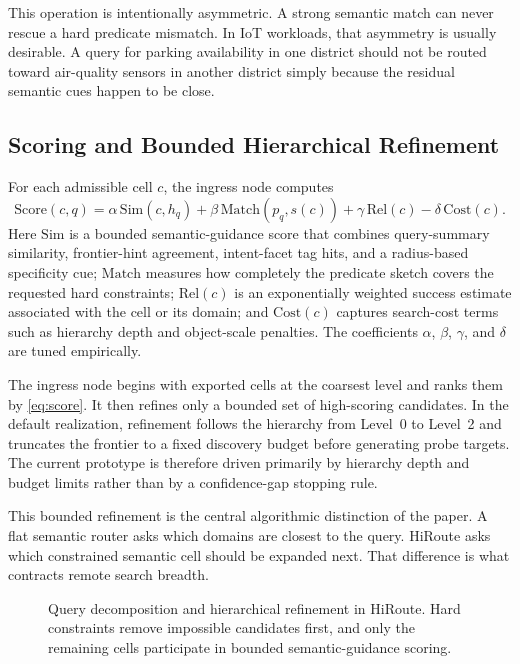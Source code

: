 \documentclass[journal]{IEEEtran}
\newcommand{\sysname}{HiRoute}
\newcommand{\score}{\mathrm{Score}}
\newcommand{\simf}{\mathrm{Sim}}
\newcommand{\matchf}{\mathrm{Match}}
\newcommand{\relf}{\mathrm{Rel}}
\newcommand{\costf}{\mathrm{Cost}}
\newcommand{\placeholderbox}[2]{%
  \begin{center}
  \fbox{\parbox[c][#1][c]{0.93\linewidth}{\centering #2}}
  \end{center}}
\newcommand{\figplaceholder}[4]{%
\begin{figure}[t]
\centering
\placeholderbox{#2}{#3}
\caption{#1}
\label{#4}
\end{figure}}
\begin{document}
This operation is intentionally asymmetric. A strong semantic match can never rescue a hard predicate mismatch. In IoT workloads, that asymmetry is usually desirable. A query for parking availability in one district should not be routed toward air-quality sensors in another district simply because the residual semantic cues happen to be close.

\subsection{Scoring and Bounded Hierarchical Refinement}

For each admissible cell $c$, the ingress node computes
\begin{equation}
\label{eq:score}
\score(c,q)=\alpha\,\simf(c,h_q)+\beta\,\matchf(p_q,s(c))+\gamma\,\relf(c)-\delta\,\costf(c).
\end{equation}
Here $\simf$ is a bounded semantic-guidance score that combines query-summary similarity, frontier-hint agreement, intent-facet tag hits, and a radius-based specificity cue; $\matchf$ measures how completely the predicate sketch covers the requested hard constraints; $\relf(c)$ is an exponentially weighted success estimate associated with the cell or its domain; and $\costf(c)$ captures search-cost terms such as hierarchy depth and object-scale penalties. The coefficients $\alpha$, $\beta$, $\gamma$, and $\delta$ are tuned empirically.

The ingress node begins with exported cells at the coarsest level and ranks them by \eqref{eq:score}. It then refines only a bounded set of high-scoring candidates. In the default realization, refinement follows the hierarchy from Level~0 to Level~2 and truncates the frontier to a fixed discovery budget before generating probe targets. The current prototype is therefore driven primarily by hierarchy depth and budget limits rather than by a confidence-gap stopping rule.

This bounded refinement is the central algorithmic distinction of the paper. A flat semantic router asks which domains are closest to the query. \sysname{} asks which constrained semantic cell should be expanded next. That difference is what contracts remote search breadth.

\figplaceholder{Query decomposition and hierarchical refinement in \sysname{}. Hard constraints remove impossible candidates first, and only the remaining cells participate in bounded semantic-guidance scoring.}{4.3cm}{\textit{Query-processing figure placeholder.}}{fig:query}
\end{document}
